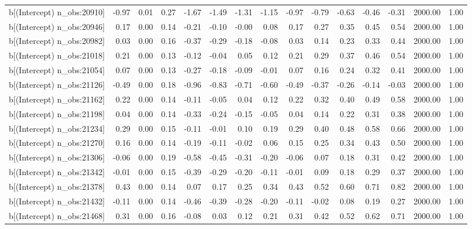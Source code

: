 \begin{table}[ht]
\begin{tabular}{rrrrrrrrrrrrrrr}
  b[(Intercept) n\_obs:20910] & -0.97 & 0.01 & 0.27 & -1.67 & -1.49 & -1.31 & -1.15 & -0.97 & -0.79 & -0.63 & -0.46 & -0.31 & 2000.00 & 1.00 \\ 
  b[(Intercept) n\_obs:20946] & 0.17 & 0.00 & 0.14 & -0.21 & -0.10 & -0.00 & 0.08 & 0.17 & 0.27 & 0.35 & 0.45 & 0.54 & 2000.00 & 1.00 \\ 
  b[(Intercept) n\_obs:20982] & 0.03 & 0.00 & 0.16 & -0.37 & -0.29 & -0.18 & -0.08 & 0.03 & 0.14 & 0.23 & 0.33 & 0.44 & 2000.00 & 1.00 \\ 
  b[(Intercept) n\_obs:21018] & 0.21 & 0.00 & 0.13 & -0.12 & -0.04 & 0.05 & 0.12 & 0.21 & 0.29 & 0.37 & 0.46 & 0.54 & 2000.00 & 1.00 \\ 
  b[(Intercept) n\_obs:21054] & 0.07 & 0.00 & 0.13 & -0.27 & -0.18 & -0.09 & -0.01 & 0.07 & 0.16 & 0.24 & 0.32 & 0.41 & 2000.00 & 1.00 \\ 
  b[(Intercept) n\_obs:21126] & -0.49 & 0.00 & 0.18 & -0.96 & -0.83 & -0.71 & -0.60 & -0.49 & -0.37 & -0.26 & -0.14 & -0.03 & 2000.00 & 1.00 \\ 
  b[(Intercept) n\_obs:21162] & 0.22 & 0.00 & 0.14 & -0.11 & -0.05 & 0.04 & 0.12 & 0.22 & 0.32 & 0.40 & 0.49 & 0.58 & 2000.00 & 1.00 \\ 
  b[(Intercept) n\_obs:21198] & 0.04 & 0.00 & 0.14 & -0.33 & -0.24 & -0.15 & -0.05 & 0.04 & 0.14 & 0.22 & 0.31 & 0.38 & 2000.00 & 1.00 \\ 
  b[(Intercept) n\_obs:21234] & 0.29 & 0.00 & 0.15 & -0.11 & -0.01 & 0.10 & 0.19 & 0.29 & 0.40 & 0.48 & 0.58 & 0.66 & 2000.00 & 1.00 \\ 
  b[(Intercept) n\_obs:21270] & 0.16 & 0.00 & 0.14 & -0.19 & -0.11 & -0.02 & 0.06 & 0.15 & 0.25 & 0.34 & 0.43 & 0.50 & 2000.00 & 1.00 \\ 
  b[(Intercept) n\_obs:21306] & -0.06 & 0.00 & 0.19 & -0.58 & -0.45 & -0.31 & -0.20 & -0.06 & 0.07 & 0.18 & 0.31 & 0.42 & 2000.00 & 1.00 \\ 
  b[(Intercept) n\_obs:21342] & -0.01 & 0.00 & 0.15 & -0.39 & -0.29 & -0.20 & -0.11 & -0.01 & 0.09 & 0.18 & 0.29 & 0.37 & 2000.00 & 1.00 \\ 
  b[(Intercept) n\_obs:21378] & 0.43 & 0.00 & 0.14 & 0.07 & 0.17 & 0.25 & 0.34 & 0.43 & 0.52 & 0.60 & 0.71 & 0.82 & 2000.00 & 1.00 \\ 
  b[(Intercept) n\_obs:21432] & -0.11 & 0.00 & 0.14 & -0.46 & -0.39 & -0.28 & -0.20 & -0.11 & -0.02 & 0.08 & 0.19 & 0.27 & 2000.00 & 1.00 \\ 
  b[(Intercept) n\_obs:21468] & 0.31 & 0.00 & 0.16 & -0.08 & 0.03 & 0.12 & 0.21 & 0.31 & 0.42 & 0.52 & 0.62 & 0.71 & 2000.00 & 1.00 \\ 

\end{tabular}
\end{table}
